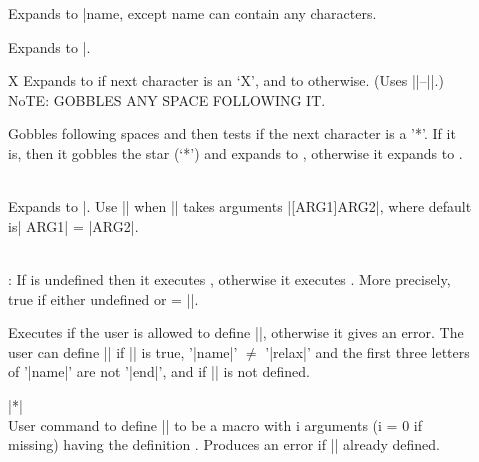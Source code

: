 \begin{description}
\item []{}
  Expands to |\def\|\marg{name},
   except name can contain any characters.
 
\item[]{}
   Expands to |\|.

 
\item[]{X}
Expands to  if next character is an `X',
          and to  otherwise.
          (Uses |\reserved@a|--|\reserved@c|.)
          NoTE: GOBBLES ANY SPACE FOLLOWING IT.
    

\item[]{}
  Gobbles following spaces and then tests if the next
 character is a '*'.  If it is, then it gobbles the
 star  (`*') and expands to , otherwise it expands to .
 
\item[]\\
     Expands to |\|.  Use
          |\@dblarg\CS| when |\CS| takes arguments |[ARG1]{ARG2}|,
          where default is| ARG1| = |ARG2|.

\item[]\\
          : If  is undefined then it executes ,
            otherwise it executes .  More precisely,
            true if  either undefined or = |\relax|.

\item[]
       Executes  if the user is allowed to define |\name|,
            otherwise it gives an error.  The user can define |\name|
            if || is true, '|name|' $\neq$ '|relax|'
            and the first three letters of '|name|' are not
           '|end|', and if |\endname| is not defined.
           
\item [] |*|\\
         User command to define |\FOO| to be a macro with
            i arguments (i = 0 if missing) having the definition
            .  Produces an error if |\FOO| already
            defined.


\end{description}
